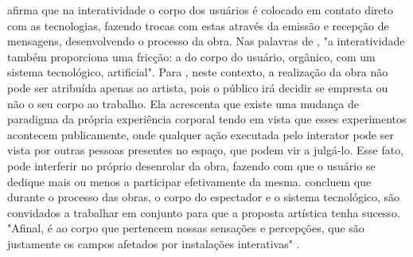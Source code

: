  afirma que na interatividade o corpo dos usuários é colocado em contato direto com as tecnologias, fazendo trocas com estas através da emissão e recepção de mensagens, desenvolvendo o processo da obra. Nas palavras de , "a interatividade também proporciona uma fricção: a do corpo do usuário, orgânico, com um sistema tecnológico, artificial". Para , neste contexto, a realização da obra não pode ser atribuída apenas ao artista, pois o público irá decidir se empresta ou não o seu corpo ao trabalho. Ela acrescenta que existe uma mudança de paradigma da própria experiência corporal tendo em vista que esses experimentos acontecem publicamente, onde qualquer ação executada pelo interator pode ser vista por outras pessoas presentes no espaço, que podem vir a julgá-lo. Esse fato, pode interferir no próprio desenrolar da obra, fazendo com que o usuário se dedique mais ou menos a participar efetivamente da mesma.  concluem que durante o processo das obras, o corpo do espectador e o sistema tecnológico, são convidados a trabalhar em conjunto para que a proposta artística tenha sucesso. "Afinal, é ao corpo que pertencem nossas sensações e percepções, que são justamente os campos afetados por instalações interativas"  \cite[p. 199]{witt}.
